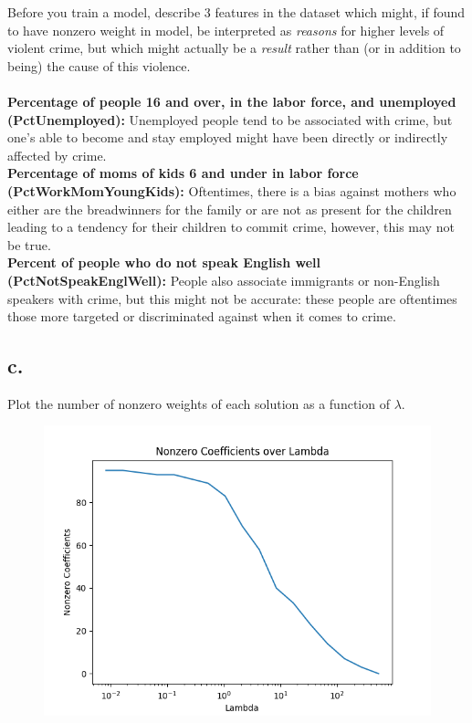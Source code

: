\documentclass{article}
\newcommand{\1}{\mathbf{1}}
\begin{document}
{Before you train a model, describe 3 features in the dataset which might, if found to have nonzero weight in model, be interpreted as \emph{reasons} for higher levels of violent crime, but which might actually be a \emph{result} rather than (or in addition to being) the cause of this violence. \\ \\
\textbf{Percentage of people 16 and over, in the labor force, and unemployed (PctUnemployed):} Unemployed people tend to be associated with crime, but one's able to become and stay employed might have been directly or indirectly affected by crime. \\
\textbf{Percentage of moms of kids 6 and under in labor force (PctWorkMomYoungKids):} Oftentimes, there is a bias against mothers who either are the breadwinners for the family or are not as present for the children leading to a tendency for their children to commit crime, however, this may not be true. \\
\textbf{Percent of people who do not speak English well (PctNotSpeakEnglWell):} People also associate immigrants or non-English speakers with crime, but this might not be accurate: these people are oftentimes those more targeted or  discriminated against when it comes to crime. \\

\subsection*{c.}

Plot the number of nonzero weights of each solution as a function of $\lambda$.

\begin{figure}[ht!]
  \centering
  \includegraphics[width=150mm]{../hw2-code/results/a5_c.png}
\end{figure}

}
\end{document}

